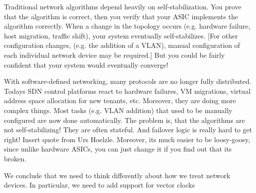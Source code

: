 

Traditional network algorithms depend heavily
on self-stabilization. You prove that the algorithm is correct, then you
verify that your ASIC implements the algorithm correctly. When a change
in the topology occurs (e.g. hardware failure, host migration, traffic
shift), your system eventually self-stabilizes. [For other configuration
changes, (e.g. the addition of a VLAN), manual configuration of each
individual network device may be required.] But you could be fairly
confident that your system would eventually converge!

With software-defined
networking, many protocols are no longer fully distributed.
Todays SDN control platforms react to hardware failures, VM
migrations, virtual address space allocation for new tenants, etc.
Moreover, they are doing more complex things. Most tasks (e.g. VLAN
addition) that used to be manually configured are now done automatically.
The problem is, that the algorithms are not self-stabilizing! They are
often stateful. And failover logic is really hard to get right!
Insert quote from Urs Hoelzle.
Moreover,
its much easier to be loosy-goosy, since unlike hardware ASICs, you
can just change it if you find out that its broken.

We conclude that we need to think differently about how we treat
network devices.  In
particular, we need to add support for vector clocks







